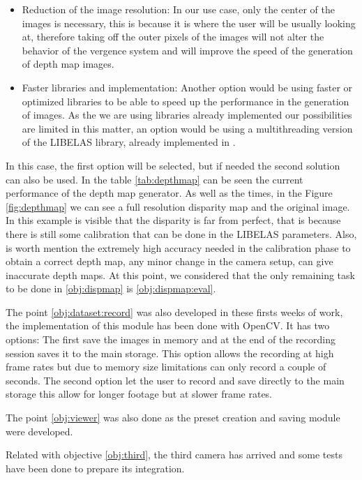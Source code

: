 \documentclass[10pt,a4paper,twocolumn,twoside]{article}
\begin{document}
	\begin{itemize}
		\item Reduction of the image resolution: In our use case, only the center of the images is necessary, this is because it is where the user will be usually looking at, therefore taking off the outer pixels of the images will not alter the behavior of the vergence system and will improve the speed of the generation of depth map images.
		
		\item Faster libraries and implementation: Another option would be using faster or optimized libraries to be able to speed up the performance in the generation of images. As the we are using libraries already implemented our possibilities are limited in this matter, an option would be using a multithreading version of the LIBELAS library, already implemented in \cite{web:LIBELAS}.
	\end{itemize}
	In this case, the first option will be selected, but if needed the second solution can also be used. In the table \ref{tab:depthmap} can be seen the current performance of the depth map generator. As well as the times, in the Figure \ref{fig:depthmap} we can see a full resolution disparity map and the original image. In this example is visible that the disparity is far from perfect, that is because there is still some calibration that can be done in the LIBELAS parameters. Also, is worth mention the extremely high accuracy needed in the calibration phase to obtain a correct depth map, any minor change in the camera setup, can give inaccurate depth maps.
	At this point, we considered that the only remaining task to be done in \ref{obj:dispmap} is \ref{obj:dispmap:eval}.
	
	The point \ref{obj:dataset:record} was also developed in these firsts weeks of work, the implementation of this module has been done with OpenCV. It has two options:
	The first save the images in memory and at the end of the recording session saves it to the main storage. This option allows the recording at high frame rates but due to memory size limitations can only record a couple of seconds. 
	The second option let the user to record and save directly to the main storage this allow for longer footage but at slower frame rates.
	
	The point \ref{obj:viewer} was also done as the preset creation and saving module were developed.
	
	Related with objective \ref{obj:third}, the third camera has arrived and some tests have been done to prepare its integration.
	
\end{document}
